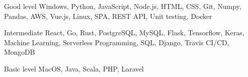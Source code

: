 \documentclass{tccv}
\begin{document}
\begin{factlist}

\item{Good level}
     {Windows, Python, JavaScript, Node.js, HTML, CSS, Git, Numpy, Pandas, AWS, Vue.js, Linux, SPA, REST API, Unit testing, Docker}

\item{Intermediate}
     {React, Go, Rust, PostgreSQL, MySQL, Flask, Tensorflow, Keras, Machine Learning, Serverless Programming, SQL, Django, Travis CI/CD, MongoDB}

\item{Basic level}
     {MacOS, Java, Scala, PHP, Laravel}

\end{factlist}
\end{document}
